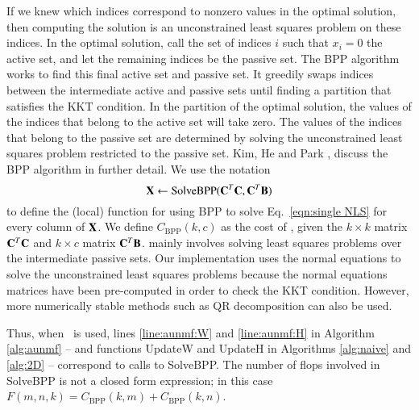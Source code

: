 If we knew which indices correspond to nonzero values in the optimal solution, then computing the solution is an unconstrained least squares problem on these indices.
In the optimal solution, call the set of indices $i$ such that $x_i=0$ the active set, and let the remaining indices be the passive set. The BPP algorithm works to find this final active set and passive set. 
It greedily swaps indices between the intermediate active and passive sets until finding a partition that satisfies the KKT condition. In the partition of the optimal solution, the values of the indices that belong to the active set will take zero. The values of the indices that belong to the passive set are determined by solving the unconstrained least squares problem restricted to the passive set. Kim, He and Park \cite{kim2011fast}, discuss the BPP algorithm in further detail. 
We use the notation
$$\mathbf{X} \gets \text{SolveBPP}(\mathbf{C}^T\mathbf{C},\mathbf{C}^T\mathbf{B})$$
to define the (local) function for using BPP to solve Eq.~\eqref{eqn:single NLS} for every column of $\mathbf{X}$.
We define $C_\text{BPP}(k,c)$ as the cost of , given the $k\times k$ matrix $\mathbf{C}^T\mathbf{C}$ and $k\times c$ matrix $\mathbf{C}^T\mathbf{B}$. 
 mainly involves solving least squares problems over the intermediate passive sets. 
Our implementation uses the normal equations to solve the unconstrained least squares problems because the normal equations matrices have been pre-computed in order to check the KKT condition.
However, more numerically stable methods such as QR decomposition can also be used.

Thus, when \BPP\ is used, lines \ref{line:aunmf:W} and \ref{line:aunmf:H} in Algorithm \ref{alg:aunmf} -- and functions UpdateW and UpdateH in Algorithms \ref{alg:naive} and \ref{alg:2D} -- correspond to calls to SolveBPP.
The number of flops involved in SolveBPP is not a closed form expression; in this case $F(m,n,k)=C_\text{BPP}(k,m)+ C_\text{BPP}(k,n)$.

